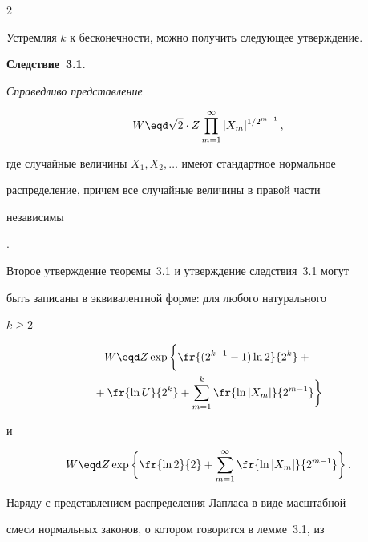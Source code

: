 \begin{multicols}{2}
\smallskip





Устремляя $k$ к бесконечности, можно получить следующее утверждение.





\medskip





\noindent


{\bf Следствие~3.1}. {\it Справедливо представление


$$


W\eqd \sqrt{2}\cdot Z \prod_{m=1}^{\infty}|X_m|^{1/2^{m-1}}\,,


$$


где случайные величины $X_1,X_2,\ldots$ имеют стандартное нормальное


распределение, причем все случайные величины в правой части


независимы}.





\smallskip





Второе утверждение теоремы~3.1 и утверждение следствия~3.1 могут


быть записаны в эквивалентной форме: для любого натурального


$k\ge2$


\begin{multline*}


W\eqd Z \exp\bigg\{\fr{(2^{k-1}-1)\ln 2}{2^k}+{}\\


{}+


\fr{\ln U}{2^k}+\sum_{m=1}^{k}\fr{\ln|X_m|}{2^{m-1}}\bigg\}


\end{multline*}


и


$$


W\eqd Z \exp\bigg\{\fr{\ln


2}{2}+\sum_{m=1}^{\infty}\fr{\ln|X_m|}{2^{m-1}}\bigg\}\,.


$$





Наряду с представлением распределения Лапласа в виде масштабной


смеси нормальных законов, о котором говорится в лемме~3.1, из



\end{multicols}
